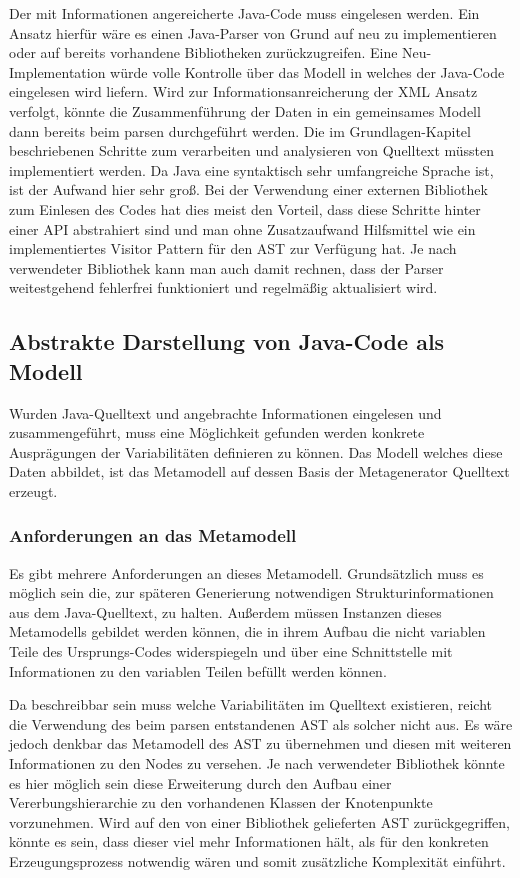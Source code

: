 \documentclass[12pt,oneside,a4paper,parskip]{scrbook}
\begin{document}
Der mit Informationen angereicherte Java-Code muss eingelesen werden. Ein Ansatz hierfür wäre es einen Java-Parser von Grund auf neu zu implementieren oder auf bereits vorhandene Bibliotheken zurückzugreifen. Eine Neu-Implementation würde volle Kontrolle über das Modell in welches der Java-Code eingelesen wird liefern. Wird zur Informationsanreicherung der XML Ansatz verfolgt, könnte die Zusammenführung der Daten in ein gemeinsames Modell dann bereits beim parsen durchgeführt werden. Die im Grundlagen-Kapitel beschriebenen Schritte zum verarbeiten und analysieren von Quelltext müssten implementiert werden. Da Java eine syntaktisch sehr umfangreiche Sprache ist, ist der Aufwand hier sehr groß. Bei der Verwendung einer externen Bibliothek zum Einlesen des Codes hat dies meist den Vorteil, dass diese Schritte hinter einer API abstrahiert sind und man ohne Zusatzaufwand Hilfsmittel wie ein implementiertes Visitor Pattern für den AST zur Verfügung hat. Je nach verwendeter Bibliothek kann man auch damit rechnen, dass der Parser weitestgehend fehlerfrei funktioniert und regelmäßig aktualisiert wird.

\subsection{Abstrakte Darstellung von Java-Code als Modell}\label{sec:codeasmodel}

Wurden Java-Quelltext und angebrachte Informationen eingelesen und zusammengeführt, muss eine Möglichkeit gefunden werden konkrete Ausprägungen der Variabilitäten definieren zu können. Das Modell welches diese Daten abbildet, ist das Metamodell auf dessen Basis der Metagenerator Quelltext erzeugt.

\subsubsection{Anforderungen an das Metamodell}

Es gibt mehrere Anforderungen an dieses Metamodell. Grundsätzlich muss es möglich sein die, zur späteren Generierung notwendigen Strukturinformationen aus dem Java-Quelltext, zu halten. Außerdem müssen Instanzen dieses Metamodells gebildet werden können, die in ihrem Aufbau die nicht variablen Teile des Ursprungs-Codes widerspiegeln und über eine Schnittstelle mit Informationen zu den variablen Teilen befüllt werden können.

Da beschreibbar sein muss welche Variabilitäten im Quelltext existieren, reicht die Verwendung des beim parsen entstandenen AST als solcher nicht aus. Es wäre jedoch denkbar das Metamodell des AST zu übernehmen und diesen mit weiteren Informationen zu den Nodes zu versehen. Je nach verwendeter Bibliothek könnte es hier möglich sein diese Erweiterung durch den Aufbau einer Vererbungshierarchie zu den vorhandenen Klassen der Knotenpunkte vorzunehmen. Wird auf den von einer Bibliothek gelieferten AST zurückgegriffen, könnte es sein, dass dieser viel mehr Informationen hält, als für den konkreten Erzeugungsprozess notwendig wären und somit zusätzliche Komplexität einführt.
\end{document}
